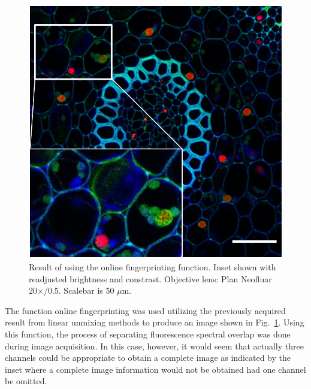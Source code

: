 \begin{figure}[h!]
\centering
\includegraphics[width=.4\columnwidth]{Exp_3_LSM/Figures/MS3/F2_olfp5_50um}
\caption{Result of using the online fingerprinting function. 
Inset shown with readjusted brightness and constrast. 
Objective lens: Plan Neofluar 20$\times$/0.5. 
Scalebar is 50 $\mu$m.}
\label{fig:olfp}
\end{figure}

The function online fingerprinting was used utilizing the previously acquired result from linear unmixing methods to produce an image shown in Fig.~\ref{fig:olfp}. 
Using this function, the process of separating fluorescence spectral overlap was done during image acquisition. 
In this case, however, it would seem that actually three channels could be appropriate to obtain a complete image as indicated by the inset where a complete image information would not be obtained had one channel be omitted.

